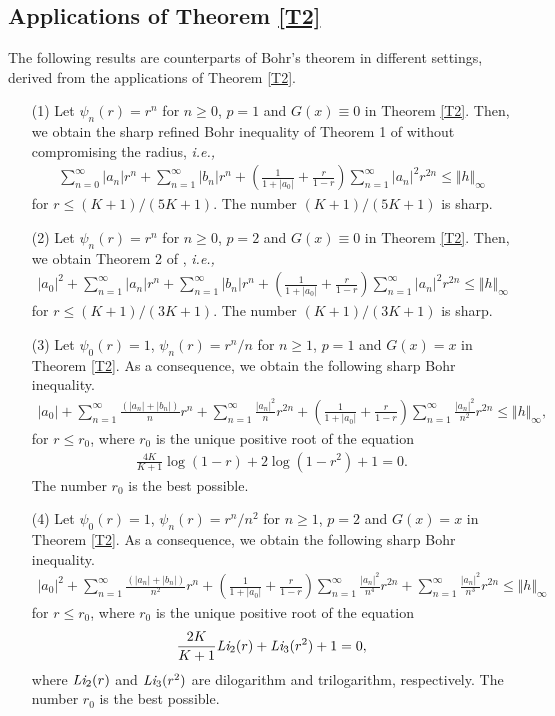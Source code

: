 \documentclass[11pt,reqno]{amsart}
\newtheorem{open problem}{Open problem}[section]
\newcommand{\beas}{\begin{eqnarray*}}
\newcommand{\eeas}{\end{eqnarray*}}
\numberwithin{equation}{section}
\begin{document}
\subsection{Applications of \textrm{Theorem \ref{T2}}}
The following results are counterparts of Bohr's theorem in different settings, derived from the applications of \textrm{Theorem \ref{T2}}.
\begin{itemize}
\item[(1)] Let $\psi_n(r)=r^n$ for $n\geq 0$, $p=1$ and $G(x)\equiv 0$ in \textrm{Theorem \ref{T2}}. Then, we obtain the sharp refined Bohr inequality of \textrm{Theorem 1} of  \cite{KPS2018} without compromising the radius, {\it i.e.,} 
\beas \sum_{n=0}^\infty |a_n|r^n+\sum_{n=1}^\infty |b_n| r^n+\left(\frac{1}{1+|a_0|}+\frac{r}{1-r}\right)\sum_{n=1}^\infty |a_n|^2 r^{2n}\leq \Vert h\Vert_\infty\eeas
for $r\leq (K+1)/(5K+1)$. The number $(K+1)/(5K+1)$ is sharp.
\item[(2)] Let $\psi_n(r)=r^n$ for $n\geq 0$, $p=2$ and $G(x)\equiv 0$ in \textrm{Theorem \ref{T2}}. Then, we obtain \textrm{Theorem 2} of  \cite{KPS2018}, {\it i.e.,} 
\beas |a_0|^2+\sum_{n=1}^\infty |a_n|r^n+\sum_{n=1}^\infty |b_n| r^n+\left(\frac{1}{1+|a_0|}+\frac{r}{1-r}\right)\sum_{n=1}^\infty |a_n|^2 r^{2n}\leq \Vert h\Vert_\infty\eeas
for $r\leq (K+1)/(3K+1)$. The number $(K+1)/(3K+1)$ is sharp.
\item[(3)] Let $\psi_0(r)=1$, $\psi_n(r)=r^n/n$ for $n\geq 1$, $p=1$ and $G(x)=x$ in \textrm{Theorem \ref{T2}}. As a consequence, we obtain the following sharp Bohr inequality.
\beas |a_0|+\sum_{n=1}^\infty \frac{\left(|a_n|+|b_n|\right)}{n}r^n+\sum_{n=1}^\infty \frac{|a_n|^2}{n} r^{2n}+\left(\frac{1}{1+|a_0|}+\frac{r}{1-r}\right)\sum_{n=1}^\infty \frac{|a_n|^2}{n^2} r^{2n}\leq \Vert h\Vert_\infty,\eeas
for $r\leq r_0$, where $r_0$ is the unique positive root of the equation
\beas \frac{4K}{K+1}\log(1-r)+2\log\left(1-r^2\right)+1=0.\eeas
The number $r_0$ is the best possible.
\item[(4)] Let $\psi_0(r)=1$, $\psi_n(r)=r^n/n^2$ for $n\geq 1$, $p=2$ and $G(x)=x$ in \textrm{Theorem \ref{T2}}. As a consequence, we obtain the following sharp Bohr inequality.
\beas |a_0|^2+\sum_{n=1}^\infty \frac{\left(|a_n|+|b_n|\right)}{n^2}r^n+\left(\frac{1}{1+|a_0|}+\frac{r}{1-r}\right)\sum_{n=1}^\infty \frac{|a_n|^2}{n^4} r^{2n}+\sum_{n=1}^\infty \frac{|a_n|^2}{n^3} r^{2n}\leq \Vert h\Vert_\infty\eeas
for $r\leq r_0$, where $r_0$ is the unique positive root of the equation
\beas \frac{2K}{K+1}\text{\it Li}_2(r)+\text{\it Li}_3(r^2)+1=0,\eeas
where $\text{\it Li}_2(r)$ and $\text{\it Li}_3(r^2)$ are dilogarithm and trilogarithm, respectively. The number $r_0$ is the best possible.
\end{itemize}
\end{document}
